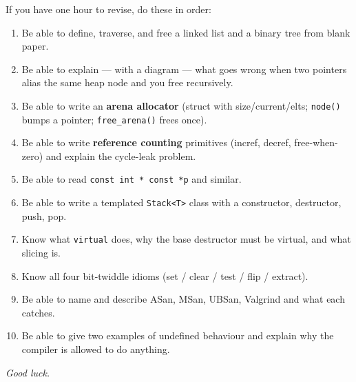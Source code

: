 \documentclass[11pt,a4paper]{article}
\begin{document}
\begin{must}
If you have one hour to revise, do these in order:
\begin{enumerate}[leftmargin=*,itemsep=2pt]
  \item Be able to define, traverse, and free a linked list and a binary tree from blank paper.
  \item Be able to explain --- with a diagram --- what goes wrong when two pointers alias the same heap node and you free recursively.
  \item Be able to write an \textbf{arena allocator} (struct with size/current/elts; \texttt{node()} bumps a pointer; \texttt{free\_arena()} frees once).
  \item Be able to write \textbf{reference counting} primitives (incref, decref, free-when-zero) and explain the cycle-leak problem.
  \item Be able to read \texttt{const int * const *p} and similar.
  \item Be able to write a templated \texttt{Stack<T>} class with a constructor, destructor, push, pop.
  \item Know what \texttt{virtual} does, why the base destructor must be virtual, and what slicing is.
  \item Know all four bit-twiddle idioms (set / clear / test / flip / extract).
  \item Be able to name and describe ASan, MSan, UBSan, Valgrind and what each catches.
  \item Be able to give two examples of undefined behaviour and explain why the compiler is allowed to do anything.
\end{enumerate}
\end{must}

\vspace{0.4cm}
\begin{center}
\textit{Good luck.}
\end{center}
\end{document}
